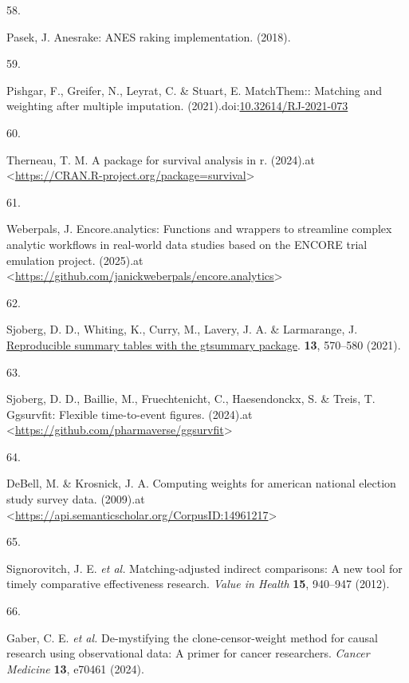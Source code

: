 \documentclass[
  letterpaper,
  DIV=11,
  numbers=noendperiod]{scrartcl}
\newlength{\cslhangindent}
\newlength{\csllabelwidth}
\newenvironment{CSLReferences}[2] %
 {\begin{list}{}{%
  \setlength{\itemindent}{0pt}
  \setlength{\leftmargin}{0pt}
  \setlength{\parsep}{0pt}
  \ifodd #1
   \setlength{\leftmargin}{\cslhangindent}
   \setlength{\itemindent}{-1\cslhangindent}
  \fi
  \setlength{\itemsep}{#2\baselineskip}}}
 {\end{list}}
\newcommand{\CSLLeftMargin}[1]{\parbox[t]{\csllabelwidth}{\strut#1\strut}}
\newcommand{\CSLRightInline}[1]{\parbox[t]{\linewidth - \csllabelwidth}{\strut#1\strut}}
\begin{document}
\begin{CSLReferences}{0}{0}
\CSLLeftMargin{58. }%
\CSLRightInline{Pasek, J. Anesrake: ANES raking implementation. (2018).}

\CSLLeftMargin{59. }%
\CSLRightInline{Pishgar, F., Greifer, N., Leyrat, C. \& Stuart, E.
MatchThem:: Matching and weighting after multiple imputation.
(2021).doi:\href{https://doi.org/10.32614/RJ-2021-073}{10.32614/RJ-2021-073}}

\CSLLeftMargin{60. }%
\CSLRightInline{Therneau, T. M. A package for survival analysis in r.
(2024).at
\textless{}\url{https://CRAN.R-project.org/package=survival}\textgreater{}}

\CSLLeftMargin{61. }%
\CSLRightInline{Weberpals, J. Encore.analytics: Functions and wrappers
to streamline complex analytic workflows in real-world data studies
based on the ENCORE trial emulation project. (2025).at
\textless{}\url{https://github.com/janickweberpals/encore.analytics}\textgreater{}}

\CSLLeftMargin{62. }%
\CSLRightInline{Sjoberg, D. D., Whiting, K., Curry, M., Lavery, J. A. \&
Larmarange, J. \href{https://doi.org/10.32614/RJ-2021-053}{Reproducible
summary tables with the gtsummary package}. \textbf{13}, 570--580
(2021).}

\CSLLeftMargin{63. }%
\CSLRightInline{Sjoberg, D. D., Baillie, M., Fruechtenicht, C.,
Haesendonckx, S. \& Treis, T. Ggsurvfit: Flexible time-to-event figures.
(2024).at
\textless{}\url{https://github.com/pharmaverse/ggsurvfit}\textgreater{}}

\CSLLeftMargin{64. }%
\CSLRightInline{DeBell, M. \& Krosnick, J. A. Computing weights for
american national election study survey data. (2009).at
\textless{}\url{https://api.semanticscholar.org/CorpusID:14961217}\textgreater{}}

\CSLLeftMargin{65. }%
\CSLRightInline{Signorovitch, J. E. \emph{et al.} Matching-adjusted
indirect comparisons: A new tool for timely comparative effectiveness
research. \emph{Value in Health} \textbf{15}, 940--947 (2012).}

\CSLLeftMargin{66. }%
\CSLRightInline{Gaber, C. E. \emph{et al.} De-mystifying the
clone-censor-weight method for causal research using observational data:
A primer for cancer researchers. \emph{Cancer Medicine} \textbf{13},
e70461 (2024).}

\end{CSLReferences}
\end{document}
